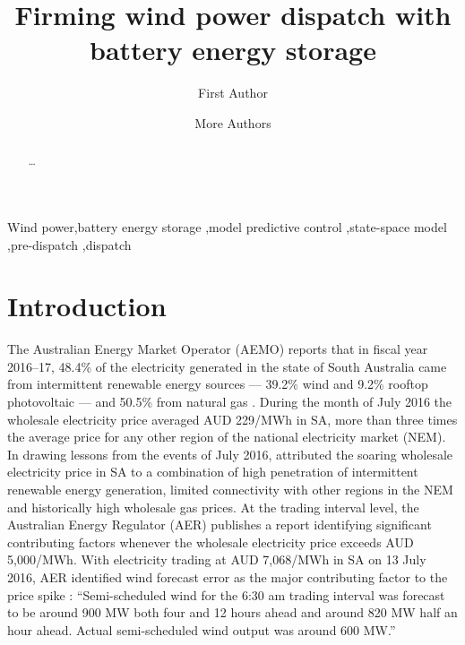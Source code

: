 \documentclass[a4paper, 10pt, twocolumn, preprint, 3p]{elsarticle}
\begin{document}
\begin{frontmatter}

\title{Firming wind power dispatch with battery energy storage}

\author[acems]{First Author}

\author[acems]{More Authors}

\address[acems]{School of Mathematical Sciences and ARC Centre of Excellence for Mathematical \& Statistical Frontiers,\\The University of Adelaide, South Australia, 5005}

\begin{abstract}
\ldots
\end{abstract}

\begin{keyword}
Wind power\sep battery energy storage \sep model predictive control \sep state-space model \sep pre-dispatch \sep dispatch
\end{keyword}

\end{frontmatter}

\section{Introduction}\label{sect:introduction}
The Australian Energy Market Operator (AEMO) reports that in fiscal year 2016--17, 48.4\% of the electricity generated in the state of South Australia came from intermittent renewable energy sources --- 39.2\% wind and 9.2\% rooftop photovoltaic --- and 50.5\% from natural gas \cite{SAER17}.  During the month of July 2016 the wholesale electricity price averaged AUD 229/MWh in SA, more than three times the average price for any other region of the national electricity market (NEM).  In drawing lessons from the events of July 2016, \cite{WB16} attributed the soaring wholesale electricity price in SA to a combination of high penetration of intermittent renewable energy generation, limited connectivity with other regions in the NEM and historically high wholesale gas prices.  At the trading interval level, the Australian Energy Regulator (AER) publishes a report identifying significant contributing factors whenever the wholesale electricity price exceeds AUD 5,000/MWh.  With electricity trading at AUD 7,068/MWh in SA on 13 July 2016, AER identified wind forecast error as the major contributing factor to the price spike \cite{AER16}: ``Semi-scheduled wind for the 6:30 am trading interval was forecast to be around 900 MW both four and 12 hours ahead and around 820 MW half an hour ahead.  Actual semi-scheduled wind output was around 600 MW.''
\end{document}

